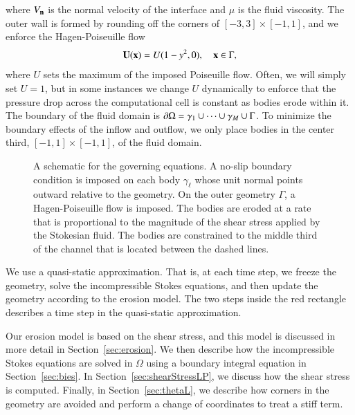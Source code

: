 \documentclass[preprint, 10pt]{elsarticle}
\begin{document}
where $V_{\mathbf{n}}$ is the normal velocity of the interface and $\mu$ is the
fluid viscosity.  The outer wall is formed by rounding off the corners
of $[-3,3] \times [-1,1]$, and we enforce the Hagen-Poiseuille flow
\begin{align*}
  {\mathbf{U}}({\mathbf{x}}) = U (1-y^2,0), \quad {\mathbf{x}} \in \Gamma,
\end{align*}
where $U$ sets the maximum of the imposed Poiseuille flow. Often, we
will simply set $U=1$, but in some instances we change $U$ dynamically
to enforce that the pressure drop across the computational cell is
constant as bodies erode within it.  The boundary of the fluid domain is
${\partial}\Omega = \gamma_1 \cup \cdots \cup \gamma_M \cup \Gamma$.  To
minimize the boundary effects of the inflow and outflow, we only place
bodies in the center third, $[-1,1] \times [-1,1]$, of the fluid domain.

\begin{figure}[htpb]
  \centering
  
  \caption{\label{fig:schematic} A schematic for the governing
    equations.  A no-slip boundary condition is imposed on each body
    $\gamma_\ell$ whose unit normal points outward relative to the
    geometry.  On the outer geometry $\Gamma$, a Hagen-Poiseuille flow
    is imposed.  The bodies are eroded at a rate that is proportional to
    the magnitude of the shear stress applied by the Stokesian fluid.
    The bodies are constrained to the middle third of the channel that
    is located between the dashed lines.}
\end{figure}

We use a quasi-static approximation.  That is, at each time step, we
freeze the geometry, solve the incompressible Stokes equations, and then
update the geometry according to the erosion model.  The two steps
inside the red rectangle describes a time step in the quasi-static
approximation.

%  

Our erosion model is based on the shear stress, and this model is
discussed in more detail in Section~\ref{sec:erosion}.  We then describe
how the incompressible Stokes equations are solved in $\Omega$ using a
boundary integral equation in Section~\ref{sec:bies}.  In
Section~\ref{sec:shearStressLP}, we discuss how the shear stress is
computed.  Finally, in Section~\ref{sec:thetaL}, we describe how corners
in the geometry are avoided and perform a change of coordinates to treat a stiff term.
\end{document}
